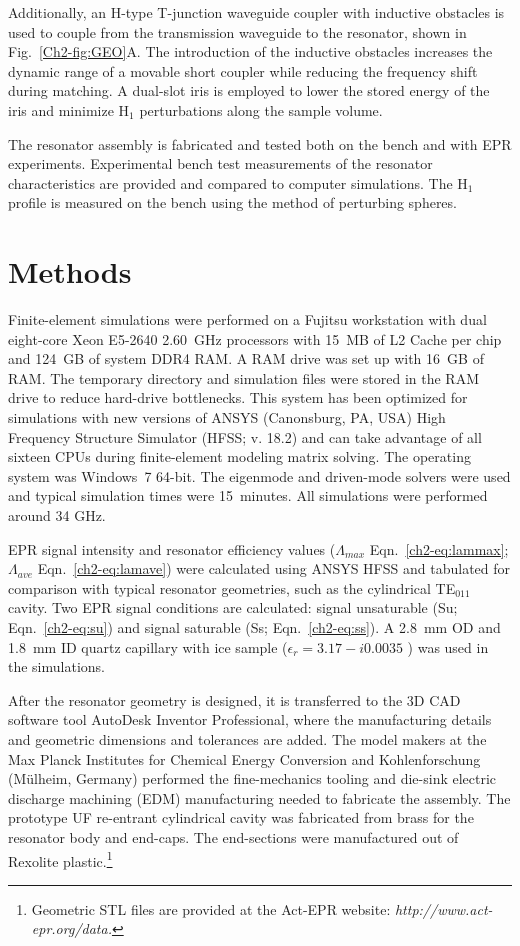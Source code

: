 Additionally, an H-type T-junction waveguide coupler with inductive obstacles is used to couple from the transmission waveguide to the resonator, shown in Fig.~\ref{Ch2-fig:GEO}A. The introduction of the inductive obstacles increases the dynamic range of a movable short coupler while reducing the frequency shift during matching. A dual-slot iris is employed to lower the stored energy of the iris and minimize H$_1$ perturbations along the sample volume. \cite{UFLGR2017}

The resonator assembly is fabricated and tested both on the bench and with EPR experiments. Experimental bench test measurements of the resonator characteristics are provided and compared to computer simulations. The H$_1$ profile is measured on the bench using the method of perturbing spheres. 

\section{Methods}
Finite-element simulations were performed on a Fujitsu workstation with dual eight-core Xeon E5-2640 2.60~GHz processors with 15~MB of L2 Cache per chip and 124~GB of system DDR4 RAM. A RAM drive was set up with 16~GB of RAM. The temporary directory and simulation files were stored in the RAM drive to reduce hard-drive bottlenecks. This system has been optimized for simulations with new versions of ANSYS (Canonsburg, PA, USA) High Frequency Structure Simulator (HFSS; v. 18.2) and can take advantage of all sixteen CPUs during finite-element modeling matrix solving. The operating system was Windows~7 64-bit. The eigenmode and driven-mode solvers were used and typical simulation times were 15~minutes. All simulations were performed around 34 GHz.

EPR signal intensity and resonator efficiency values ($\Lambda_{max}$ Eqn.~\ref{ch2-eq:lammax}; $\Lambda_{ave}$ Eqn.~\ref{ch2-eq:lamave}) were calculated using ANSYS HFSS \cite{misrabook} and tabulated for comparison with typical resonator geometries, such as the cylindrical TE$_{011}$ cavity. \cite{generalte011} Two EPR signal conditions are calculated: signal unsaturable (Su; Eqn.~\ref{ch2-eq:su}) and signal saturable (Ss; Eqn.~\ref{ch2-eq:ss}). A 2.8~mm OD and 1.8~mm ID quartz capillary with ice sample ($\epsilon_r=3.17-i0.0035$ \cite{icedielectric} ) was used in the simulations.

After the resonator geometry is designed, it is transferred to the 3D CAD software tool AutoDesk Inventor Professional, where the manufacturing details and geometric dimensions and tolerances are added. The model makers at the Max Planck Institutes for Chemical Energy Conversion and Kohlenforschung (M\"ulheim, Germany) performed the fine-mechanics tooling and die-sink electric discharge machining (EDM) manufacturing needed to fabricate the assembly. The prototype UF re-entrant cylindrical \cylTE{} cavity was fabricated from brass for the resonator body and end-caps. The end-sections were manufactured out of Rexolite plastic.\footnote{Geometric STL files are provided at the Act-EPR website: \textit{http://www.act-epr.org/data.}}

